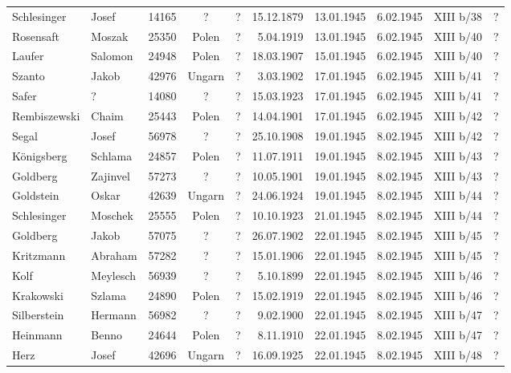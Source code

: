 \documentclass[a4paper,12pt,ngerman,
]{nisebook}
\begin{document}
\begin{tiny}
\begin{longtable}[l]{|l|l|r|c|c|r|r|r|c|r|}
Schlesinger  &  Josef  & 14165 &  ?  &  ?  & 15.12.1879 & 13.01.1945 & 6.02.1945 &  XIII b/38  &  ? \\[3pt]
Rosensaft  &  Moszak  & 25350 &  Polen  &  ?  & 5.04.1919 & 13.01.1945 & 6.02.1945 &  XIII b/40  &  ? \\[3pt]
Laufer  &  Salomon  & 24948 &  Polen  &  ?  & 18.03.1907 & 15.01.1945 & 6.02.1945 &  XIII b/40  &  ? \\[3pt]
Szanto  &  Jakob  & 42976 &  Ungarn  &  ?  & 3.03.1902 & 17.01.1945 & 6.02.1945 &  XIII b/41  &  ? \\[3pt]
Safer  &  ?  & 14080 &  ?  &  ?  & 15.03.1923 & 17.01.1945 & 6.02.1945 &  XIII b/41  &  ? \\[3pt]
Rembiszewski  &  Chaim  & 25443 &  Polen  &  ?  & 14.04.1901 & 17.01.1945 & 6.02.1945 &  XIII b/42  &  ? \\[3pt]
Segal  &  Josef  & 56978 &  ?  &  ?  & 25.10.1908 & 19.01.1945 & 8.02.1945 &  XIII b/42  &  ? \\[3pt]
Königsberg  &  Schlama  & 24857 &  Polen  &  ?  & 11.07.1911 & 19.01.1945 & 8.02.1945 &  XIII b/43  &  ? \\[3pt]
Goldberg  &  Zajinvel  & 57273 &  ?  &  ?  & 10.05.1901 & 19.01.1945 & 8.02.1945 &  XIII b/43  &  ? \\[3pt]
Goldstein   &  Oskar  & 42639 &  Ungarn  &  ?  & 24.06.1924 & 19.01.1945 & 8.02.1945 &  XIII b/44  &  ? \\[3pt]
Schlesinger  &  Moschek  & 25555 &  Polen  &  ?  & 10.10.1923 & 21.01.1945 & 8.02.1945 &  XIII b/44  &  ? \\[3pt]
Goldberg  &  Jakob  & 57075 &  ?  &  ?  & 26.07.1902 & 22.01.1945 & 8.02.1945 &  XIII b/45  &  ? \\[3pt]
Kritzmann  &  Abraham  & 57282 &  ?  &  ?  & 15.01.1906 & 22.01.1945 & 8.02.1945 &  XIII b/45  &  ? \\[3pt]
Kolf  &  Meylesch  & 56939 &  ?  &  ?  & 5.10.1899 & 22.01.1945 & 8.02.1945 &  XIII b/46  &  ? \\[3pt]
Krakowski  &  Szlama  & 24890 &  Polen  &  ?  & 15.02.1919 & 22.01.1945 & 8.02.1945 &  XIII b/46  &  ? \\[3pt]
Silberstein  &  Hermann  & 56982 &  ?  &  ?  & 9.02.1900 & 22.01.1945 & 8.02.1945 &  XIII b/47  &  ? \\[3pt]
Heinmann  &  Benno  & 24644 &  Polen  &  ?  & 8.11.1910 & 22.01.1945 & 8.02.1945 &  XIII b/47  &  ? \\[3pt]
Herz  &  Josef  & 42696 &  Ungarn  &  ?  &  16.09.1925 & 22.01.1945 & 8.02.1945 &  XIII b/48  &  ? \\[3pt]

\end{longtable}
\end{tiny}
\end{document}
